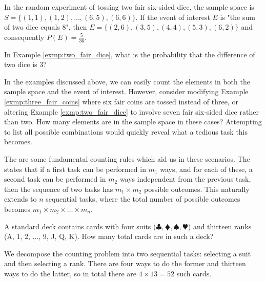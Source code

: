 \begin{exmp}\label{exmp:two_fair_dice}
	In the random experiment of tossing two fair six-sided dice, the sample space is
	\( S = \{ (1, 1), (1, 2), \ldots, (6, 5), (6, 6) \} \).
	If the event of interest \( E \) is "the sum of two dice equals 8",
	then \( E = \{ (2, 6), (3, 5), (4, 4), (5, 3), (6, 2) \} \) and consequently \( P(E) = \frac{5}{36} \).
\end{exmp}

\begin{ex}
	In Example \autoref{exmp:two_fair_dice}, what is the probability that the difference of two dice is 3?
\end{ex}

In the examples discussed above, we can easily count the elements in both the sample space and the event of interest.
However, consider modifying Example \autoref{exmp:three_fair_coins} where six fair coins are tossed instead of three,
or altering Example \autoref{exmp:two_fair_dice} to involve seven fair six-sided dice rather than two.
How many elements are in the sample space in these cases?
Attempting to list all possible combinations would quickly reveal what a tedious task this becomes.

The are some fundamental counting rules which aid us in these scenarios.
The  states that if a first task can be performed in \( m_1 \) ways,
and for each of these, a second task can be performed in \( m_2 \) ways independent from the previous task,
then the sequence of two tasks has \( m_1 \times m_2 \) possible outcomes.
This naturally extends to \( n \) sequential tasks,
where the total number of possible outcomes becomes \( m_1 \times m_2 \times \ldots \times m_n \).

\begin{exmp}
	A standard deck contains cards with four suits (\( \clubsuit, \vardiamondsuit, \spadesuit, \varheartsuit \)) and thirteen ranks (A, 1, 2, ..., 9, J, Q, K).
	How many total cards are in such a deck?
\end{exmp}
\begin{solution}
	We decompose the counting problem into two sequential tasks:
	selecting a suit and then selecting a rank.
	There are four ways to do the former and thirteen ways to do the latter, so in total there are \( 4 \times 13 = 52 \) such cards.
\end{solution}